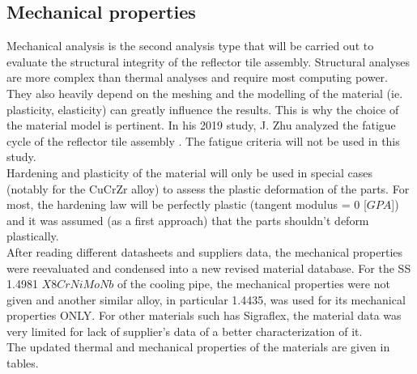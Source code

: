 \subsection{Mechanical properties}
\normalsize{Mechanical analysis is the second analysis type that will be carried out to evaluate the structural integrity of the reflector tile assembly. Structural analyses are more complex than thermal analyses and require most computing power. They also heavily depend on the meshing and the modelling of the material (ie. plasticity, elasticity) can greatly influence the results. This is why the choice of the material model is pertinent. In his 2019 study, J. Zhu analyzed the fatigue cycle of the reflector tile assembly \cites{zhu_parametric_2019}. The fatigue criteria will not be used in this study.}
\\
\break
\normalsize{\indent Hardening and plasticity of the material will only be used in special cases (notably for the \acrshort{CuCrZr} alloy) to assess the plastic deformation of the parts. For most, the hardening law will be perfectly plastic (tangent modulus = 0 [$GPA$]) and it was assumed (as a first approach) that the parts shouldn't deform plastically.}
\\
\break
\normalsize{\indent After reading different datasheets and suppliers data, the mechanical properties were reevaluated and condensed into a new revised material database. For the \acrlong{SS} 1.4981 $X8CrNiMoNb$ of the cooling pipe, the mechanical properties were not given and another similar alloy, in particular 1.4435, was used for its mechanical properties ONLY. For other materials such has \acrshort{Sigraflex}, the material data was very limited for lack of supplier's data of a better characterization of it.}
\\
\break
\normalsize{\indent The updated thermal and mechanical properties of the materials are given in tables.}
